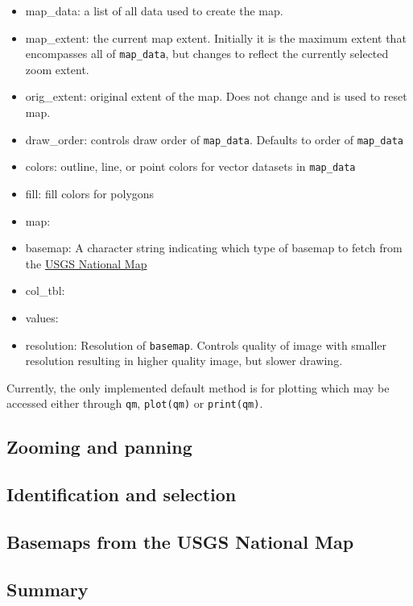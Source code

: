 \begin{itemize}
\tightlist
\item
  map\_data: a list of all data used to create the map.
\item
  map\_extent: the current map extent. Initially it is the maximum
  extent that encompasses all of \texttt{map\_data}, but changes to
  reflect the currently selected zoom extent.
\item
  orig\_extent: original extent of the map. Does not change and is used
  to reset map.
\item
  draw\_order: controls draw order of \texttt{map\_data}. Defaults to
  order of \texttt{map\_data}
\item
  colors: outline, line, or point colors for vector datasets in
  \texttt{map\_data}
\item
  fill: fill colors for polygons
\item
  map:
\item
  basemap: A character string indicating which type of basemap to fetch
  from the \href{}{USGS National Map}
\item
  col\_tbl:
\item
  values:
\item
  resolution: Resolution of \texttt{basemap}. Controls quality of image
  with smaller resolution resulting in higher quality image, but slower
  drawing.
\end{itemize}

Currently, the only implemented default method is for plotting which may
be accessed either through \texttt{qm}, \texttt{plot(qm)} or
\texttt{print(qm)}.

\subsection{Zooming and panning}\label{zooming-and-panning}

\subsection{Identification and
selection}\label{identification-and-selection}

\subsection{Basemaps from the USGS National
Map}\label{basemaps-from-the-usgs-national-map}

\subsection{Summary}\label{summary}

